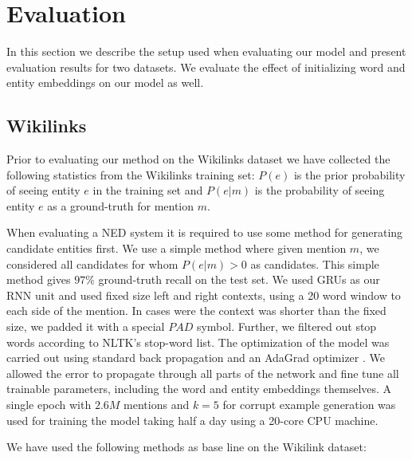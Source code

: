 \documentclass[11pt]{article}
\begin{document}
	\section{Evaluation} \label{experiments}
	
	In this section we describe the setup used when evaluating our model and present evaluation results for two datasets. We evaluate the effect of initializing word and entity embeddings on our model as well.

	\subsection{Wikilinks}
	
	Prior to evaluating our method on the Wikilinks dataset we have collected the following statistics from the Wikilinks training set: $P(e)$ is the prior probability of seeing entity $e$ in the training set and $P(e|m)$ is the probability of seeing entity $e$ as a ground-truth for mention $m$. 
	
	When evaluating a NED system it is required to use some method for generating candidate entities first. We use a simple method where given mention $m$, we considered all candidates for whom $P(e|m)>0$ as candidates. This simple method gives $97\%$ ground-truth recall on the test set. 
	We used GRUs as our RNN unit and used fixed size left and right contexts, using a 20 word window to each side of the mention. In cases were the context was shorter than the fixed size, we padded it with a special $PAD$ symbol. Further, we filtered out stop words according to NLTK's stop-word list.
	The optimization of the model was carried out using standard back propagation and an AdaGrad optimizer \cite{duchi2011adaptive}. We allowed the error to propagate through all parts of the network and fine tune all trainable parameters, including the word and entity embeddings themselves. A single epoch with $2.6M$ mentions and $k=5$ for corrupt example generation was used for training the model taking half a day using a 20-core CPU machine.
	
	We have used the following methods as base line on the Wikilink dataset:
\end{document}
